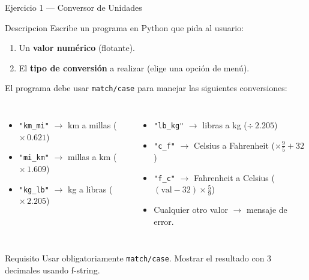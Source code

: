 \documentclass[aspectratio=169,xcolor=dvipsnames]{beamer}
\begin{document}
\begin{frame}{Ejercicio 1 — Conversor de Unidades}
    \begin{block}{Descripcion}
        Escribe un programa en Python que pida al usuario:
        \begin{enumerate}
            \item Un \textbf{valor numérico} (flotante).
            \item El \textbf{tipo de conversión} a realizar (elige una opción de menú).
        \end{enumerate}
    \end{block}

    \vspace{0.3cm}
    El programa debe usar \texttt{match/case} para manejar las siguientes conversiones:

    \begin{columns}
        \begin{itemize}
            \item \texttt{"km\_mi"} $\rightarrow$ km a millas \hfill ($\times\,0.621$)
            \item \texttt{"mi\_km"} $\rightarrow$ millas a km \hfill ($\times\,1.609$)
            \item \texttt{"kg\_lb"} $\rightarrow$ kg a libras \hfill ($\times\,2.205$)
        \end{itemize}
        \begin{itemize}
            \item \texttt{"lb\_kg"} $\rightarrow$ libras a kg \hfill ($\div\,2.205$)
            \item \texttt{"c\_f"}   $\rightarrow$ Celsius a Fahrenheit \hfill ($\times\frac{9}{5}+32$)
            \item \texttt{"f\_c"}   $\rightarrow$ Fahrenheit a Celsius \hfill ($(\text{val}-32)\times\frac{5}{9}$)
            \item Cualquier otro valor $\rightarrow$ mensaje de error.
        \end{itemize}
    \end{columns}

    \vspace{0.2cm}
    \begin{alertblock}{Requisito}
        Usar obligatoriamente \texttt{match/case}. Mostrar el resultado con 3 decimales usando f-string.
    \end{alertblock}
\end{frame}
\end{document}
